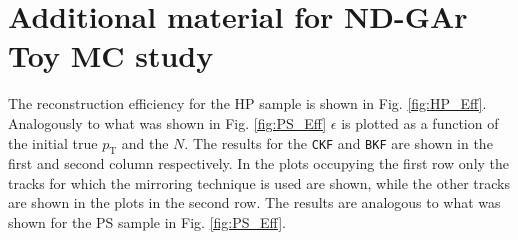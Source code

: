 \section{Additional material for ND-GAr Toy MC study}
\label{App:MoreNDGAr}

The reconstruction efficiency for the HP sample is shown in Fig. \ref{fig:HP_Eff}. Analogously to what was shown in Fig. \ref{fig:PS_Eff} $\epsilon$ is plotted as a function of the initial true $p_\textrm{T}$ and the $N$. The results for the \texttt{CKF} and \texttt{BKF} are shown in the first and second column respectively. In the plots occupying the first row only the tracks for which the mirroring technique is used are shown, while the other tracks are shown in the plots in the second row. The results are analogous to what was shown for the PS sample in Fig. \ref{fig:PS_Eff}.

